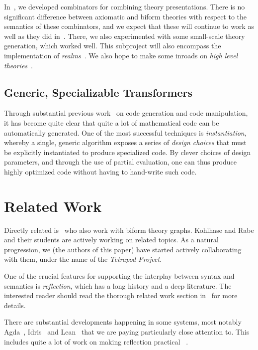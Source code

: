 \documentclass[fleqn]{llncs}
\begin{document}
In~\cite{CaretteOConnorTPC}, we developed combinators for combining
theory presentations. There is no significant difference between
axiomatic and biform theories with respect to the semantics of
these combinators, and we expect that these will continue to work
as well as they did in~\cite{MathSchemeExper}. There, we also
experimented with some small-scale theory generation, which worked
well. This subproject will also encompass the implementation of
\emph{realms}~\cite{CaretteEtAl14}.  We also hope to make some
inroads on \emph{high level theories}~\cite{CaretteFarmer08}.

\subsection*{Generic, Specializable Transformers}

Through substantial previous work~%
\cite{CaretteKS09,Carette06,CaElSm11,MathSchemeExper,CaretteKiselyov2005,CaretteKiselyov11,CaretteKucera07,CaretteKucera11,carette2016simplifying,KuceraCarette06,Larjani13,narayanan2016probabilistic}
on code generation and code manipulation, it has become quite clear that
quite a lot of mathematical code can be automatically generated.
One of the most successful techniques is \emph{instantiation},
whereby a single, generic algorithm exposes a series of
\emph{design choices} that must be explicitly instantiated to produce
specialized code. By clever choices of design parameters, and through the
use of partial evaluation, one can thus produce highly optimized code
without having to hand-write such code.

\section{Related Work}

Directly related is~\cite{KohlhaseManceRabe13} who also work with biform theory
graphs. Kohlhase and Rabe and their students are actively working on
related topics. As a natural progression, we (the authors of this paper)
have started actively collaborating with them, under the name of the
\emph{Tetrapod Project}.

One of the crucial features for supporting the interplay between
syntax and semantics is \emph{reflection}, which has a long history
and a deep literature. The interested reader should read the 
thorough related work section in~\cite{Farmer18} for more details.

There are substantial developments happening in some systems, most
notably Agda~\cite{Norell07,Norell09}, Idris~\cite{Brady13} and
Lean~\cite{Lean} that we are paying particularly close attention to.  This includes
quite a lot of work on making reflection practical~%
\cite{Christiansen:2016,Christiansen:2014,ebner2017metaprogramming,VanDerWalt12}.
\end{document}
